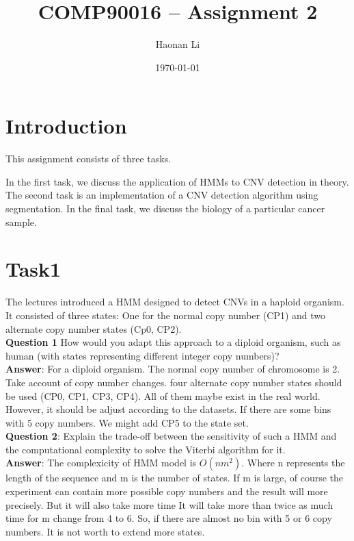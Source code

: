 \documentclass[a4paper]{article}
\title{\bfseries{COMP90016 -- Assignment 2 }}
\author{Haonan Li}
\date{\today}
\begin{document}
\maketitle

\section{Introduction}
\label{sec:introduction}

This assignment consists of three tasks. 

In the first task, we discuss the application of HMMs to CNV detection in theory. The second task is an implementation of a CNV detection algorithm using segmentation. In the final task, we discuss the biology of a particular cancer sample.

\section{Task1}

The lectures introduced a HMM designed to detect CNVs in a haploid organism. It consisted of three states: One for the normal copy number (CP1) and two alternate copy number states (Cp0, CP2).\\

\noindent\textbf{Question 1} How would you adapt this approach to a diploid organism, such as human (with states representing different integer copy numbers)? \\

\noindent\textbf{Answer}: For a diploid organism. The normal copy number of chromosome is 2. Take account of copy number changes. four alternate copy number states should be used (CP0, CP1, CP3, CP4). All of them maybe exist in the real world. However, it should be adjust according to the datasets. If there are some bins with 5 copy numbers. We might add CP5 to the state set.\\

\noindent\textbf{Question 2}: Explain the trade-off between the sensitivity of such a HMM and the computational complexity to solve the Viterbi algorithm for it.\\

\noindent\textbf{Answer}: The complexicity of HMM model is $O(nm^2)$. Where n represents the length of the sequence and m is the number of states. If m is large, of course the experiment can contain more possible copy numbers and the result will more precisely. But it will also take more time It will take more than twice as much time for m change from 4 to 6. So, if there are almost no bin with 5 or 6 copy numbers. It is not worth to extend more states.\\
\end{document}
